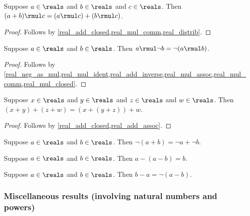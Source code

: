 \begin{lemma}\label{real_right_distrib}
    Suppose $a\in\reals$ and $b\in\reals$ and $c\in\reals$.
    Then $(a + b) \rmul c = (a \rmul c) + (b \rmul c)$.
\end{lemma}
\begin{proof}
    Follows by \cref{real_add_closed,real_mul_comm,real_distrib}.
\end{proof}

\begin{lemma}\label{real_mul_neg_right}
    Suppose $a\in\reals$ and $b\in\reals$.
    Then $a \rmul \neg{b} = \neg{(a \rmul b)}$.
\end{lemma}
\begin{proof}
    Follows by \cref{real_neg_as_mul,real_mul_ident,real_add_inverse,real_mul_assoc,real_mul_comm,real_mul_closed}.
\end{proof}

\begin{lemma}\label{real_add_regroup}
    Suppose $x\in\reals$ and $y\in\reals$ and $z\in\reals$ and $w\in\reals$.
    Then $(x + y) + (z + w) = (x + (y + z)) + w$.
\end{lemma}
\begin{proof}
    Follows by \cref{real_add_closed,real_add_assoc}.
\end{proof}

\begin{lemma}\label{real_neg_addition}
    Suppose $a\in\reals$ and $b\in\reals$.
    Then $\neg{(a + b)} = \neg{a} + \neg{b}$.
\end{lemma}

\begin{lemma}\label{real_sub_sub_cancel}
    Suppose $a\in\reals$ and $b\in\reals$.
    Then $a - (a - b) = b$.
\end{lemma}

\begin{lemma}\label{real_sub_swap_neg}
    Suppose $a\in\reals$ and $b\in\reals$.
    Then $b - a = \neg{(a - b)}$.
\end{lemma}

\subsubsection{Miscellaneous results (involving natural numbers and powers)}


